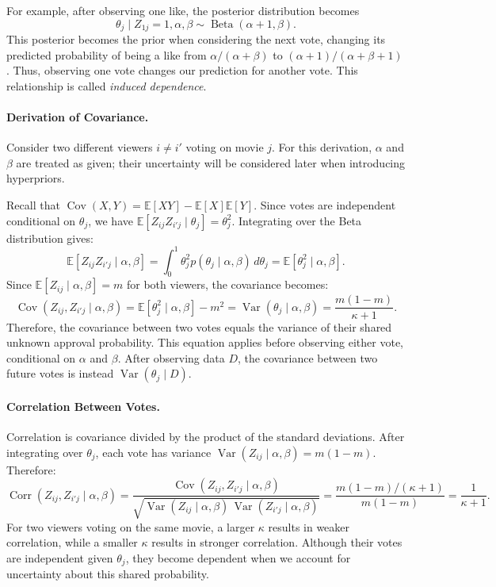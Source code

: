 \documentclass[11pt,a4paper]{article}
\newcommand{\E}{\mathbb{E}}
\newcommand{\Var}{\operatorname{Var}}
\newcommand{\Cov}{\operatorname{Cov}}
\newcommand{\BetaD}{\operatorname{Beta}}
\begin{document}
For example, after observing one like, the posterior distribution becomes
\begin{equation}
\theta_j\mid Z_{1j}=1,\alpha,\beta
\sim\BetaD(\alpha+1,\beta).
\end{equation}
This posterior becomes the prior when considering the next vote, changing its predicted probability of being a like from $\alpha/(\alpha+\beta)$ to $(\alpha+1)/(\alpha+\beta+1)$. Thus, observing one vote changes our prediction for another vote. This relationship is called \emph{induced dependence}.

\paragraph{Derivation of Covariance.}

Consider two different viewers $i\ne i'$ voting on movie $j$. For this derivation, $\alpha$ and $\beta$ are treated as given; their uncertainty will be considered later when introducing hyperpriors.

Recall that $\Cov(X,Y)=\E[XY]-\E[X]\E[Y]$. Since votes are independent conditional on $\theta_j$, we have $\E[Z_{ij}Z_{i'j}\mid\theta_j]=\theta_j^2$. Integrating over the Beta distribution gives:
\begin{equation}
\E[Z_{ij}Z_{i'j}\mid\alpha,\beta]
=\int_0^1\theta_j^2 p(\theta_j\mid\alpha,\beta)\,d\theta_j
=\E[\theta_j^2\mid\alpha,\beta].
\end{equation}
Since $\E[Z_{ij}\mid\alpha,\beta]=m$ for both viewers, the covariance becomes:
\begin{equation}
\Cov(Z_{ij},Z_{i'j}\mid\alpha,\beta)
=\E[\theta_j^2\mid\alpha,\beta]-m^2
=\Var(\theta_j\mid\alpha,\beta)
=\frac{m(1-m)}{\kappa+1}.
\label{eq:vote-covariance}
\end{equation}
Therefore, the covariance between two votes equals the variance of their shared unknown approval probability. This equation applies before observing either vote, conditional on $\alpha$ and $\beta$. After observing data $D$, the covariance between two future votes is instead $\Var(\theta_j\mid D)$.

\paragraph{Correlation Between Votes.}

Correlation is covariance divided by the product of the standard deviations. After integrating over $\theta_j$, each vote has variance $\Var(Z_{ij}\mid\alpha,\beta)=m(1-m)$. Therefore:
\begin{equation}
\operatorname{Corr}(Z_{ij},Z_{i'j}\mid\alpha,\beta)
=\frac{\Cov(Z_{ij},Z_{i'j}\mid\alpha,\beta)}
{\sqrt{\Var(Z_{ij}\mid\alpha,\beta)\,
\Var(Z_{i'j}\mid\alpha,\beta)}}
=\frac{m(1-m)/(\kappa+1)}{m(1-m)}
=\frac{1}{\kappa+1}.
\label{eq:vote-correlation}
\end{equation}
For two viewers voting on the same movie, a larger $\kappa$ results in weaker correlation, while a smaller $\kappa$ results in stronger correlation. Although their votes are independent given $\theta_j$, they become dependent when we account for uncertainty about this shared probability.
\end{document}
